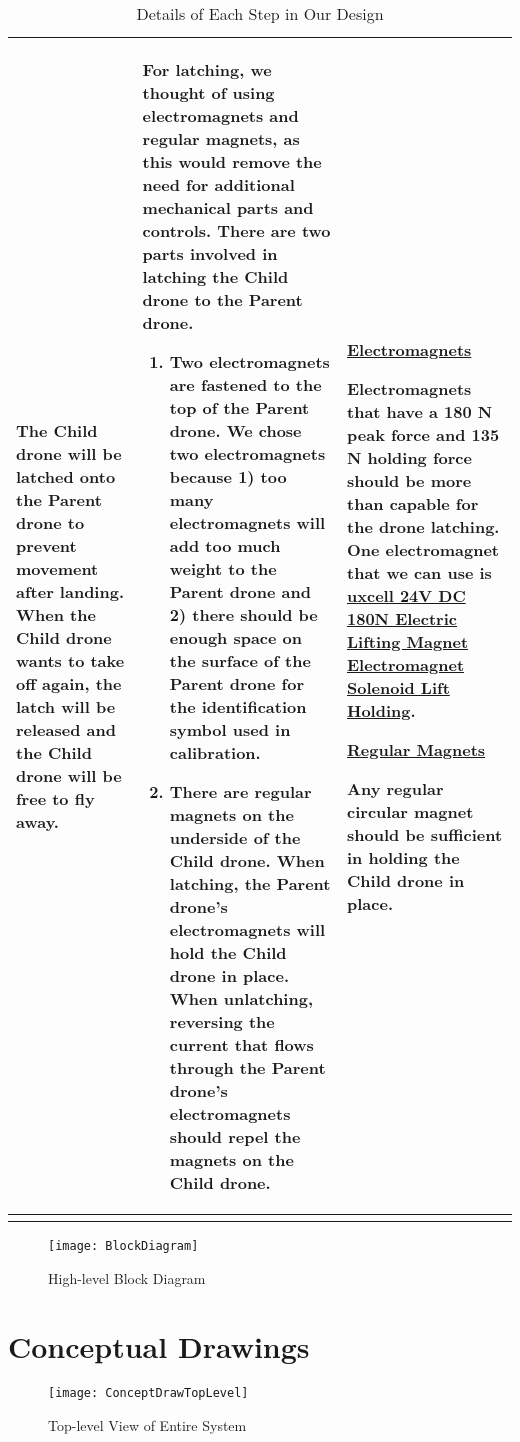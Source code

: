 \documentclass[paper=a4, fontsize=12pt]{scrartcl}
\begin{document}
\begin{longtable} { |p{}|p{}|p{}| }
	The Child drone will be latched onto the Parent drone to prevent movement after landing.
	When the Child drone wants to take off again, the latch will be released and the Child drone will be free to fly away.
	&
	For latching, we thought of using electromagnets and regular magnets, as this would remove the need for additional mechanical parts and controls.
	There are two parts involved in latching the Child drone to the Parent drone.
	\begin{enumerate}
		\item Two electromagnets are fastened to the top of the Parent drone. We chose two electromagnets because 1) too many electromagnets will add too much weight to the Parent drone and 2) there should be enough space on the surface of the Parent drone for the identification symbol used in calibration. 
		\item There are regular magnets on the underside of the Child drone. When latching, the Parent drone's electromagnets will hold the Child drone in place. When unlatching, reversing the current that flows through the Parent drone's electromagnets should repel the magnets on the Child drone. 
	\end{enumerate}
	& 
	\underline{Electromagnets}\par 
	Electromagnets that have a 180 \si{\newton} peak force and 135 \si{\newton} holding force should be more than capable for the drone latching. One electromagnet that we can use is \href{https://www.amazon.com/uxcell-Electric-Lifting-Electromagnet-Solenoid/dp/B01MUA0ZLE}{uxcell 24V DC 180N Electric Lifting Magnet Electromagnet Solenoid Lift Holding}.\par\hfill\par
	\underline{Regular Magnets}\par
	Any regular circular magnet should be sufficient in holding the Child drone in place.\\
	\hline
	\caption{Details of Each Step in Our Design}
	\label{table:steps}
\end{longtable}
\newpage

\begin{figure}[h!]
	\centering
	\texttt{[image: BlockDiagram]}
	\caption{High-level Block Diagram}
	\label{fig:prelimblockdiagram}
\end{figure}

\newpage
\section{Conceptual Drawings}
\begin{figure}[h]
	\centering
	\texttt{[image: ConceptDrawTopLevel]}
	\caption{Top-level View of Entire System}
	\label{fig:toplevel}
\end{figure}
\end{document}
